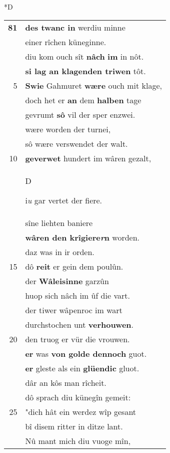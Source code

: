 \documentclass[8pt,a4paper,notitlepage]{article}
\begin{document}
\begin{table}[ht]
\begin{minipage}[t]{0.5\linewidth}
\small
\begin{center}*D
\end{center}
\begin{tabular}{rl}
\textbf{81} & \textbf{des twanc in} werdiu minne\\ 
 & einer rîchen küneginne.\\ 
 & diu kom ouch sît \textbf{nâch} \textbf{im} in nôt.\\ 
 & \textbf{si lag an klagenden triwen} tôt.\\ 
5 & \textbf{Swie} Gahmuret \textbf{wære} ouch mit klage,\\ 
 & doch het er \textbf{an} dem \textbf{halben} tage\\ 
 & gevrumt \textbf{sô} vil der sper enzwei.\\ 
 & wære worden der turnei,\\ 
 & sô wære verswendet der walt.\\ 
10 & \textbf{geverwet} hundert im wâren gezalt,\\ 
 & \begin{large}D\end{large}i\textit{u} gar vertet der fiere.\\ 
 & sîne liehten baniere\\ 
 & \textbf{wâren den krîgiere\textit{r}n} worden.\\ 
 & daz was in ir orden.\\ 
15 & dô \textbf{reit} er gein dem poulûn.\\ 
 & der \textbf{Wâleisinne} garzûn\\ 
 & huop sich nâch im ûf die vart.\\ 
 & der tiwer wâpenroc im wart\\ 
 & durchstochen unt \textbf{verhouwen}.\\ 
20 & den truog er vür die vrouwen.\\ 
 & \textbf{er} was \textbf{von golde dennoch} guot.\\ 
 & \textbf{er} gleste als ein \textbf{glüendic} gluot.\\ 
 & dâr an kôs man rîcheit.\\ 
 & dô sprach diu künegîn gemeit:\\ 
25 & "dich hât ein werdez wîp gesant\\ 
 & bî disem ritter in ditze lant.\\ 
 & Nû mant mich diu vuoge mîn,\\ 

\end{tabular}
\end{minipage}
\end{table}
\end{document}
